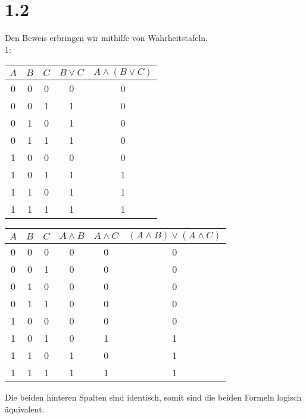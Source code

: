 \documentclass[12pt]{article}
\begin{document}
\section*{1.2}
Den Beweis erbringen wir mithilfe von Wahrheitstafeln. \\

1: 


\begin{tabular}{|c|c|c|c||c|}
\hline
$A$ & $B$   & $C$   & $B \vee C$    & $A \wedge (B \vee C)$  \\
\hline
\hline
0   &  0    & 0     &   0           &   0\\
0   &  0    & 1     &   1           &   0\\
0   &  1    & 0     &   1           &   0\\
0   &  1    & 1     &   1           &   0\\
1   &  0    & 0     &   0           &   0\\
1   &  0    & 1     &   1           &   1\\
1   &  1    & 0     &   1           &   1\\
1   &  1    & 1     &   1           &   1\\
\hline

\end{tabular}




\begin{tabular}{|c|c|c|c|c||c|}
\hline
$A$ & $B$   & $C$   & $A \wedge B$  & $A \wedge C$  & $(A \wedge B) \vee (A \wedge C)$  \\
\hline
\hline
0   &  0    & 0     &   0           &   0           & 0 \\
0   &  0    & 1     &   0           &   0           & 0 \\
0   &  1    & 0     &   0           &   0           & 0 \\
0   &  1    & 1     &   0           &   0           & 0 \\
1   &  0    & 0     &   0           &   0           & 0 \\
1   &  0    & 1     &   0           &   1           & 1 \\
1   &  1    & 0     &   1           &   0           & 1 \\
1   &  1    & 1     &   1           &   1           & 1 \\
\hline

\end{tabular}

Die beiden hinteren Spalten sind identisch, somit sind die beiden Formeln logisch äquivalent.
\end{document}
